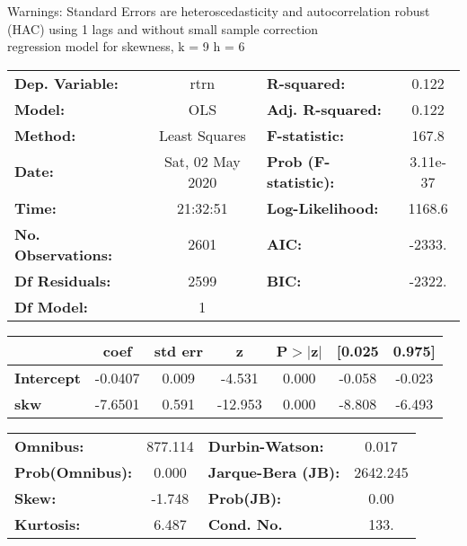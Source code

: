 Warnings: \newline
 [1] Standard Errors are heteroscedasticity and autocorrelation robust (HAC) using 1 lags and without small sample correction\\ 

regression model for skewness, k = 9 h = 6\begin{center}
\begin{tabular}{lclc}
\toprule
\textbf{Dep. Variable:}    &       rtrn       & \textbf{  R-squared:         } &     0.122   \\
\textbf{Model:}            &       OLS        & \textbf{  Adj. R-squared:    } &     0.122   \\
\textbf{Method:}           &  Least Squares   & \textbf{  F-statistic:       } &     167.8   \\
\textbf{Date:}             & Sat, 02 May 2020 & \textbf{  Prob (F-statistic):} &  3.11e-37   \\
\textbf{Time:}             &     21:32:51     & \textbf{  Log-Likelihood:    } &    1168.6   \\
\textbf{No. Observations:} &        2601      & \textbf{  AIC:               } &    -2333.   \\
\textbf{Df Residuals:}     &        2599      & \textbf{  BIC:               } &    -2322.   \\
\textbf{Df Model:}         &           1      & \textbf{                     } &             \\
\bottomrule
\end{tabular}
\begin{tabular}{lcccccc}
                   & \textbf{coef} & \textbf{std err} & \textbf{z} & \textbf{P$> |$z$|$} & \textbf{[0.025} & \textbf{0.975]}  \\
\midrule
\textbf{Intercept} &      -0.0407  &        0.009     &    -4.531  &         0.000        &       -0.058    &       -0.023     \\
\textbf{skw}       &      -7.6501  &        0.591     &   -12.953  &         0.000        &       -8.808    &       -6.493     \\
\bottomrule
\end{tabular}
\begin{tabular}{lclc}
\textbf{Omnibus:}       & 877.114 & \textbf{  Durbin-Watson:     } &    0.017  \\
\textbf{Prob(Omnibus):} &   0.000 & \textbf{  Jarque-Bera (JB):  } & 2642.245  \\
\textbf{Skew:}          &  -1.748 & \textbf{  Prob(JB):          } &     0.00  \\
\textbf{Kurtosis:}      &   6.487 & \textbf{  Cond. No.          } &     133.  \\
\bottomrule
\end{tabular}
\end{center}

